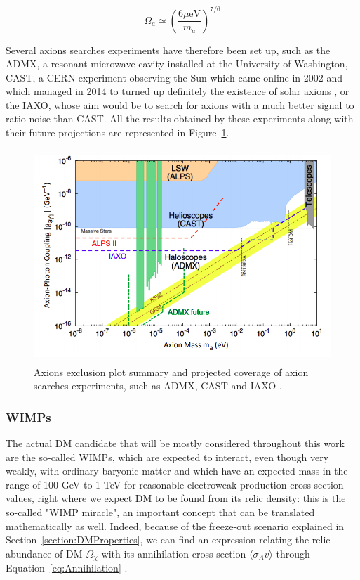 \documentclass[a4paper, 10pt, openright]{report}
\begin{document}
\begin{equation}
\label{equation:AxionDensity}
\Omega_a \simeq \left ( \frac{6 \mu \text{eV}}{m_a} \right )^{7/6}
\end{equation}

Several axions searches experiments have therefore been set up, such as the \ac{ADMX}, a resonant microwave cavity installed at the University of Washington, \ac{CAST}, a CERN experiment observing the Sun which came online in 2002 and which managed in 2014 to turned up definitely the existence of solar axions \cite{CASTLimit}, or the \ac{IAXO}, whose aim would be to search for axions with a much better signal to ratio noise than \ac{CAST}. All the results obtained by these experiments along with their future projections are represented in Figure~\ref{figure:AxionSummary}.

\begin{figure}[htbp]
\begin{center}
\includegraphics[width=12cm, height=8cm]{figs/AxionSummary.png}
\caption{Axions exclusion plot summary and projected coverage of axion searches experiments, such as \ac{ADMX}, \ac{CAST} and \ac{IAXO} \cite{AxionSearches}.}
\label{figure:AxionSummary}
\end{center}
\end{figure}

\subsubsection*{\acfp{WIMP}} 
The actual \ac{DM} candidate that will be mostly considered throughout this work are the so-called \acfp{WIMP}, which are expected to interact, even though very weakly, with ordinary baryonic matter and which have an expected mass in the range of 100 GeV to 1 TeV for reasonable electroweak production cross-section values, right where we expect \ac{DM} to be found from its relic density: this is the so-called "WIMP miracle", an important concept that can be translated mathematically as well. Indeed, because of the freeze-out scenario explained in Section~\ref{section:DMProperties}, we can find an expression relating the relic abundance of \ac{DM} $\Omega_\chi$ with its annihilation cross section $\langle \sigma_A v \rangle$ through Equation~\ref{eq:Annihilation} \cite{IndirectSearches}.
\end{document}
